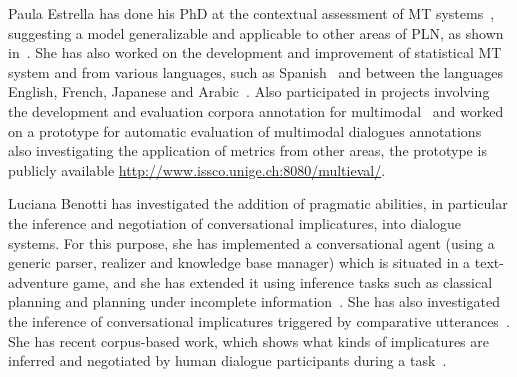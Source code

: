 Paula Estrella has done his PhD at the contextual assessment of MT
systems~\cite{estr:impr08,estr:femt09}, suggesting a model generalizable and
applicable to other areas of PLN, as shown in~\cite{Miller2008}. She has also
worked on the development and improvement of
statistical MT system and from various languages, such as
Spanish~\cite{estr:expe05} and between the languages English, French, Japanese
and Arabic~\cite{rayner-EtAl:2009:GEAF}. Also participated in projects involving
the development and evaluation
corpora annotation for multimodal~\cite{pope:estr07} and worked on
a prototype for automatic evaluation of multimodal dialogues
annotations~\cite{multieval} also investigating the application of metrics from
other areas, the prototype is publicly available
\url{http://www.issco.unige.ch:8080/multieval/}.


Luciana Benotti has investigated the addition of pragmatic abilities, in
particular the inference and negotiation of conversational implicatures, into
dialogue systems. For this purpose, she has implemented a conversational agent
(using a generic parser, realizer and knowledge base manager) which  is situated
in a text-adventure game, and she has extended it using inference tasks such as
classical planning and planning under incomplete information~\cite{benotti09b}.
She has also investigated the inference of conversational implicatures triggered
by comparative utterances~\cite{benotti09a}. She has recent
corpus-based work, which shows what kinds of implicatures are inferred and
negotiated by human dialogue participants during a task~\cite{benotti09c}. 






